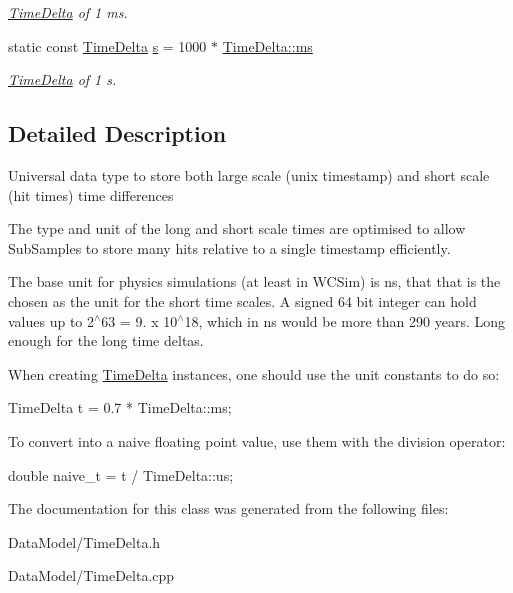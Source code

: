 \begin{DoxyCompactItemize}
\begin{DoxyCompactList}\small\item\em \hyperlink{classTimeDelta}{Time\-Delta} of 1 ms. \end{DoxyCompactList}\item 
\hypertarget{classTimeDelta_af7435a6440a54b9d16135bafc1d8856c}{static const \hyperlink{classTimeDelta}{Time\-Delta} \hyperlink{classTimeDelta_af7435a6440a54b9d16135bafc1d8856c}{s} = 1000 $\ast$ \hyperlink{classTimeDelta_a46782a352ae9ed3cffd8f8a4d50828ed}{Time\-Delta\-::ms}}\label{classTimeDelta_af7435a6440a54b9d16135bafc1d8856c}

\begin{DoxyCompactList}\small\item\em \hyperlink{classTimeDelta}{Time\-Delta} of 1 s. \end{DoxyCompactList}\end{DoxyCompactItemize}


\subsection{Detailed Description}
Universal data type to store both large scale (unix timestamp) and short scale (hit times) time differences

The type and unit of the long and short scale times are optimised to allow Sub\-Samples to store many hits relative to a single timestamp efficiently.

The base unit for physics simulations (at least in W\-C\-Sim) is ns, that that is the chosen as the unit for the short time scales. A signed 64 bit integer can hold values up to 2$^\wedge$63 = 9. x 10$^\wedge$18, which in ns would be more than 290 years. Long enough for the long time deltas.

When creating \hyperlink{classTimeDelta}{Time\-Delta} instances, one should use the unit constants to do so\-: \begin{DoxyVerb}TimeDelta t = 0.7 * TimeDelta::ms;
\end{DoxyVerb}


To convert into a naive floating point value, use them with the division operator\-: \begin{DoxyVerb}double naive_t = t / TimeDelta::us;\end{DoxyVerb}
 

The documentation for this class was generated from the following files\-:\begin{DoxyCompactItemize}
\item 
Data\-Model/Time\-Delta.\-h\item 
Data\-Model/Time\-Delta.\-cpp\end{DoxyCompactItemize}
